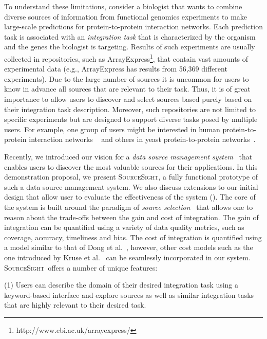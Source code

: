 \documentclass{vldb}
\newcommand\system{\textsc{SourceSight}}
\begin{document}
To understand these limitations, consider a biologist that wants to combine diverse sources of information from functional genomics experiments to make large-scale predictions for protein-to-protein interaction networks. Each prediction task is associated with an {\em integration task} that is characterized by the organism and the genes the biologist is targeting. Results of such experiments are usually collected in repositories, such as ArrayExpress\footnote{http://www.ebi.ac.uk/arrayexpress/}, that contain vast amounts of experimental data (e.g., ArrayExpress has results from 56,369 different experiments). Due to the large number of sources it is uncommon for users to know in advance all sources that are relevant to their task. Thus, it is of great importance to allow users to discover and select sources based purely based on their integration task description. Moreover, such repositories are not limited to specific experiments but are designed to support diverse tasks posed by multiple users. For example, one group of users might be interested in human protein-to-protein interaction networks ~\cite{humanpp} and others in yeast protein-to-protein networks~\cite{yeastpp}.

Recently, we introduced our vision for a {\em data source management system}~\cite{rekatsinas:2015} that enables users to discover the most valuable sources for their applications. In this demonstration proposal, we present \system, a fully functional prototype of such a data source management system. We also discuss extensions to our initial design that allow user to evaluate the effectiveness of the system (). The core of the system is built around the paradigm of {\em source selection}~\cite{dong:vldb13} that allows one to reason about the trade-offs between the gain and cost of integration. The gain of integration can be quantified using a variety of data quality metrics, such as coverage, accuracy, timeliness and bias. The cost of integration is quantified using a model similar to that of Dong et al.~\cite{dong:vldb13}, however, other cost models such as the one introduced by Kruse et al.~\cite{kruse2015estimating} can be seamlessly incorporated in our system. \system~offers a number of unique features:

\vspace{2pt}\noindent (1) Users can describe the domain of their desired integration task using a keyword-based interface and explore sources as well as similar integration tasks that are highly relevant to their desired task.
\end{document}

